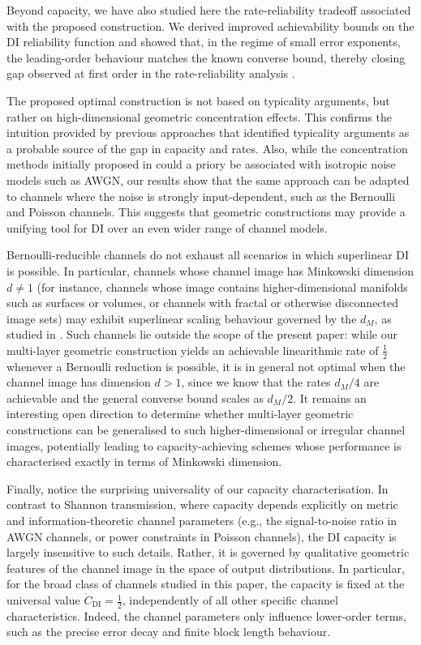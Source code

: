 \documentclass[10pt, conference]{IEEEtran}
\newcommand{\1}{\mathds{1}}
\begin{document}
Beyond capacity, we have also studied here the rate-reliability tradeoff associated with the proposed construction. We derived improved achievability bounds on the DI reliability function and showed that, in the regime of small error exponents, the leading-order behaviour matches the known converse bound, thereby closing gap observed at first order in the rate-reliability analysis \cite{CDBW:Reliability-TCOM,RRGauss-arXiv}.

The proposed optimal construction is not based on typicality arguments, but rather on high-dimensional geometric concentration effects. 
This confirms the intuition provided by previous approaches that identified typicality arguments as a probable source of the gap in capacity and rates.
Also, while the concentration methods initially proposed in \cite{CDBW:Gauss} could a priory be associated with isotropic noise models such as AWGN, our results show that the same approach can be adapted to channels where the noise is strongly input-dependent, such as the Bernoulli and Poisson channels. This suggests that geometric constructions may provide a unifying tool for DI over an even wider range of channel models.

Bernoulli-reducible channels do not exhaust all scenarios in which superlinear DI is possible. In particular, channels whose channel image has Minkowski dimension $d\neq 1$ (for instance, channels whose image contains higher-dimensional manifolds such as surfaces or volumes, or channels with fractal or otherwise disconnected image sets) may exhibit superlinear scaling behaviour governed by the $d_M$, as studied in \cite{CDBW:DI_classical}. Such channels lie outside the scope of the present paper: while our multi-layer geometric construction yields an achievable linearithmic rate of $\frac12$ whenever a Bernoulli reduction is possible, it is in general not optimal when the channel image has dimension $d>1$, since we know that the rates $d_M/4$ are achievable and the general converse bound scales as $d_M/2$. It remains an interesting open direction to determine whether multi-layer geometric constructions can be generalised to such higher-dimensional or irregular channel images, potentially leading to capacity-achieving schemes whose performance is characterised exactly in terms of Minkowski dimension.

Finally, notice the surprising universality of our capacity characterisation. In contrast to Shannon transmission, where capacity depends explicitly on metric and information-theoretic channel parameters (e.g., the signal-to-noise ratio in AWGN channels, or power constraints in Poisson channels), the DI capacity is largely insensitive to such details. Rather, it is governed by qualitative geometric features of the channel image in the space of output distributions. In particular, for the broad class of channels studied in this paper, the capacity is fixed at the universal value $\dot C_{\text{DI}}=\frac12$, independently of all other specific channel characteristics. Indeed, the channel parameters only influence lower-order terms, such as the precise error decay and finite block length behaviour.






\end{document}
